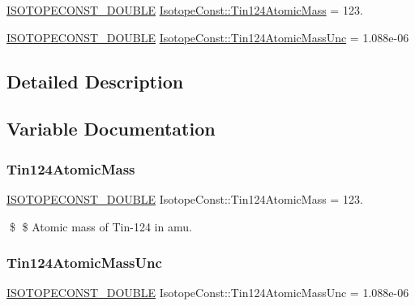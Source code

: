 \begin{DoxyCompactItemize}
\item 
\mbox{\hyperlink{group___isotope_const-_macros_ga8f45a7272ce02c0b4c65c44636ed719a}{I\+S\+O\+T\+O\+P\+E\+C\+O\+N\+S\+T\+\_\+\+D\+O\+U\+B\+LE}} \mbox{\hyperlink{group___isotope_const-_tin-_sn124_ga7d1d2a77eccb11c2b725f55e7b18c2e6}{Isotope\+Const\+::\+Tin124\+Atomic\+Mass}} = 123.
\item 
\mbox{\hyperlink{group___isotope_const-_macros_ga8f45a7272ce02c0b4c65c44636ed719a}{I\+S\+O\+T\+O\+P\+E\+C\+O\+N\+S\+T\+\_\+\+D\+O\+U\+B\+LE}} \mbox{\hyperlink{group___isotope_const-_tin-_sn124_ga989b950792756441bda0379ee50a394f}{Isotope\+Const\+::\+Tin124\+Atomic\+Mass\+Unc}} = 1.\+088e-\/06
\end{DoxyCompactItemize}


\subsection{Detailed Description}


\subsection{Variable Documentation}
\mbox{\label{group___isotope_const-_tin-_sn124_ga7d1d2a77eccb11c2b725f55e7b18c2e6}} 
\subsubsection{\texorpdfstring{Tin124\+Atomic\+Mass}{Tin124AtomicMass}}
{\footnotesize\ttfamily \mbox{\hyperlink{group___isotope_const-_macros_ga8f45a7272ce02c0b4c65c44636ed719a}{I\+S\+O\+T\+O\+P\+E\+C\+O\+N\+S\+T\+\_\+\+D\+O\+U\+B\+LE}} Isotope\+Const\+::\+Tin124\+Atomic\+Mass = 123.}

\$ \$ Atomic mass of Tin-\/124 in amu. \mbox{\label{group___isotope_const-_tin-_sn124_ga989b950792756441bda0379ee50a394f}} 
\subsubsection{\texorpdfstring{Tin124\+Atomic\+Mass\+Unc}{Tin124AtomicMassUnc}}
{\footnotesize\ttfamily \mbox{\hyperlink{group___isotope_const-_macros_ga8f45a7272ce02c0b4c65c44636ed719a}{I\+S\+O\+T\+O\+P\+E\+C\+O\+N\+S\+T\+\_\+\+D\+O\+U\+B\+LE}} Isotope\+Const\+::\+Tin124\+Atomic\+Mass\+Unc = 1.\+088e-\/06}

